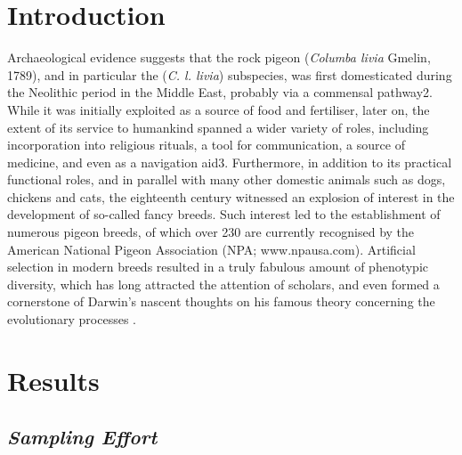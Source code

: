 \documentclass[a4paper]{article}
\begin{document}
\newpage


\section{Introduction}

Archaeological evidence suggests that the rock pigeon (\textit{Columba livia} Gmelin, 1789), and in particular the (\textit{C. l. livia}) subspecies, was first domesticated during the Neolithic period in the Middle East, probably via a commensal pathway2. While it was initially exploited as a source of food and fertiliser, later on, the extent of its service to humankind spanned a wider variety of roles, including incorporation into religious rituals, a tool for communication, a source of medicine, and even as a navigation aid3. Furthermore, in addition to its practical functional roles, and in parallel with many other domestic animals such as dogs, chickens and cats, the eighteenth century witnessed an explosion of interest in the development of so-called fancy breeds. Such interest led to the establishment of numerous pigeon breeds, of which over 230 are currently recognised by the American National Pigeon Association (NPA; www.npausa.com). Artificial selection in modern breeds resulted in a truly fabulous amount of phenotypic diversity, which has long attracted the attention of scholars, and even formed a cornerstone of Darwin’s nascent thoughts on his famous theory concerning the evolutionary processes \cite{pacheco_darwins_2020}.\



\section{Results}

\subsection{\textit{Sampling Effort}}
\end{document}
